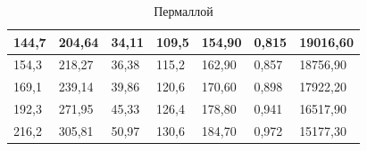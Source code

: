\documentclass[a4paper,12pt]{article} %
\begin{document}
\begin{table}[h!]
\begin{tabular}{|l|l|l|l|l|l|l|}
		144,7                                     & 204,64                                                  & 34,11                                                 & 109,5                                    & 154,90                                                  & 0,815                        & 19016,60                                        \\ \hline
		154,3                                     & 218,27                                                  & 36,38                                                 & 115,2                                    & 162,90                                                  & 0,857                        & 18756,90                                        \\ \hline
		169,1                                     & 239,14                                                  & 39,86                                                 & 120,6                                    & 170,60                                                  & 0,898                        & 17922,20                                        \\ \hline
		192,3                                     & 271,95                                                  & 45,33                                                 & 126,4                                    & 178,80                                                  & 0,941                        & 16517,90                                        \\ \hline
		216,2                                     & 305,81                                                  & 50,97                                                 & 130,6                                    & 184,70                                                  & 0,972                        & 15177,30                                        \\ \hline
	\end{tabular}
	\caption{Пермаллой}
\end{table}
\end{document}
